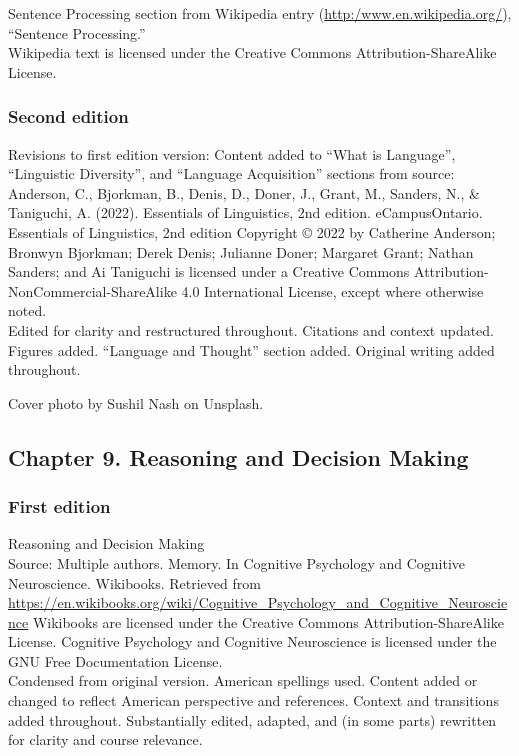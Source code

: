 \documentclass[
]{krantz}
\begin{document}
Sentence Processing section from Wikipedia entry (\url{http:/www.en.wikipedia.org/}), ``Sentence Processing.''\\
Wikipedia text is licensed under the Creative Commons Attribution-ShareAlike License.

\subsubsection*{Second edition}\label{second-edition-7}


Revisions to first edition version: Content added to ``What is Language'', ``Linguistic Diversity'', and ``Language Acquisition'' sections from source: Anderson, C., Bjorkman, B., Denis, D., Doner, J., Grant, M., Sanders, N., \& Taniguchi, A. (2022). Essentials of Linguistics, 2nd edition. eCampusOntario.
Essentials of Linguistics, 2nd edition Copyright © 2022 by Catherine Anderson; Bronwyn Bjorkman; Derek Denis; Julianne Doner; Margaret Grant; Nathan Sanders; and Ai Taniguchi is licensed under a Creative Commons Attribution-NonCommercial-ShareAlike 4.0 International License, except where otherwise noted.\\

Edited for clarity and restructured throughout. Citations and context updated. Figures added. ``Language and Thought'' section added. Original writing added throughout.

Cover photo by Sushil Nash on Unsplash.

\subsection*{Chapter 9. Reasoning and Decision Making}\label{chapter-9.-reasoning-and-decision-making}


\subsubsection*{First edition}\label{first-edition-9}


Reasoning and Decision Making\\
Source: Multiple authors. Memory. In Cognitive Psychology and Cognitive Neuroscience. Wikibooks. Retrieved from \url{https://en.wikibooks.org/wiki/Cognitive_Psychology_and_Cognitive_Neuroscience}
Wikibooks are licensed under the Creative Commons Attribution-ShareAlike License.
Cognitive Psychology and Cognitive Neuroscience is licensed under the GNU Free Documentation License.\\
Condensed from original version. American spellings used. Content added or changed to reflect American perspective and references. Context and transitions added throughout. Substantially edited, adapted, and (in some parts) rewritten for clarity and course relevance.
\end{document}
